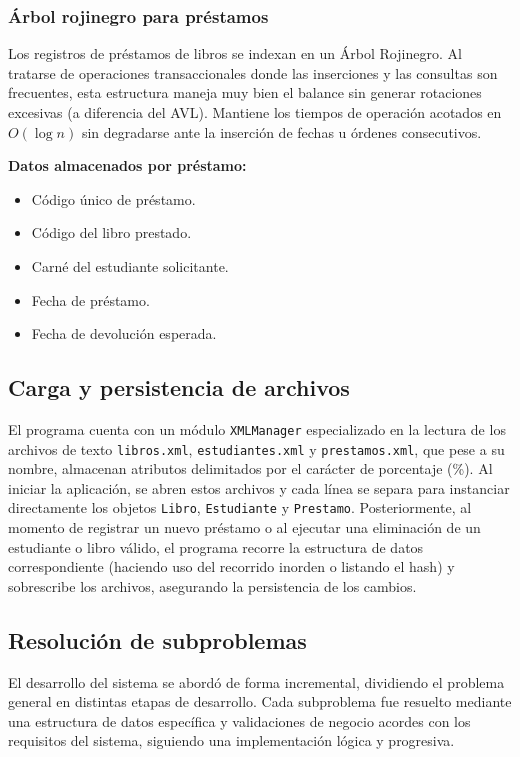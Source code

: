 \documentclass[11pt]{article}
\begin{document}
\subsubsection{Árbol rojinegro para préstamos}

Los registros de préstamos de libros se indexan en un Árbol Rojinegro. Al tratarse de operaciones transaccionales donde las inserciones y las consultas son frecuentes, esta estructura maneja muy bien el balance sin generar rotaciones excesivas (a diferencia del AVL). Mantiene los tiempos de operación acotados en $O(\log n)$ sin degradarse ante la inserción de fechas u órdenes consecutivos.

\textbf{Datos almacenados por préstamo:}
\begin{itemize}[noitemsep]
    \item Código único de préstamo.
    \item Código del libro prestado.
    \item Carné del estudiante solicitante.
    \item Fecha de préstamo.
    \item Fecha de devolución esperada.
\end{itemize}

\subsection{Carga y persistencia de archivos}

El programa cuenta con un módulo \texttt{XMLManager} especializado en la lectura de los archivos de texto \texttt{libros.xml}, \texttt{estudiantes.xml} y \texttt{prestamos.xml}, que pese a su nombre, almacenan atributos delimitados por el carácter de porcentaje (\%). Al iniciar la aplicación, se abren estos archivos y cada línea se separa para instanciar directamente los objetos \texttt{Libro}, \texttt{Estudiante} y \texttt{Prestamo}. Posteriormente, al momento de registrar un nuevo préstamo o al ejecutar una eliminación de un estudiante o libro válido, el programa recorre la estructura de datos correspondiente (haciendo uso del recorrido inorden o listando el hash) y sobrescribe los archivos, asegurando la persistencia de los cambios.

\subsection{Resolución de subproblemas}

El desarrollo del sistema se abordó de forma incremental, dividiendo el problema general en distintas etapas de desarrollo. Cada subproblema fue resuelto mediante una estructura de datos específica y validaciones de negocio acordes con los requisitos del sistema, siguiendo una implementación lógica y progresiva.
\end{document}
